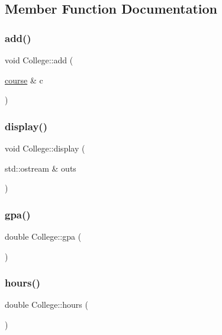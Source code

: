 \subsection{Member Function Documentation}
\hypertarget{class_college_a67fd1d8970b46b24ce2e0dd72598a22f}{}\label{class_college_a67fd1d8970b46b24ce2e0dd72598a22f} 
\subsubsection{\texorpdfstring{add()}{add()}}
{\footnotesize\ttfamily void College\+::add (\begin{DoxyParamCaption}\item[{\hyperlink{classcourse}{course} \&}]{c }\end{DoxyParamCaption})}

\hypertarget{class_college_a52ca0a164483cf5c05591cd0fb8b300c}{}\label{class_college_a52ca0a164483cf5c05591cd0fb8b300c} 
\subsubsection{\texorpdfstring{display()}{display()}}
{\footnotesize\ttfamily void College\+::display (\begin{DoxyParamCaption}\item[{std\+::ostream \&}]{outs }\end{DoxyParamCaption})}

\hypertarget{class_college_aaf9bfaa0bc717e96da6365661a96fcd0}{}\label{class_college_aaf9bfaa0bc717e96da6365661a96fcd0} 
\subsubsection{\texorpdfstring{gpa()}{gpa()}}
{\footnotesize\ttfamily double College\+::gpa (\begin{DoxyParamCaption}{ }\end{DoxyParamCaption})}

\hypertarget{class_college_a8a7a762611a1d7e00c453390d49355fd}{}\label{class_college_a8a7a762611a1d7e00c453390d49355fd} 
\subsubsection{\texorpdfstring{hours()}{hours()}}
{\footnotesize\ttfamily double College\+::hours (\begin{DoxyParamCaption}{ }\end{DoxyParamCaption})}

